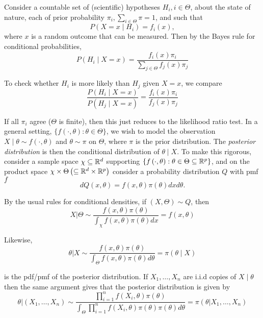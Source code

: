 \documentclass[a4paper]{article}
\begin{document}
\begin{eg}
	Consider a countable set of (scientific) hypotheses $H_i, i \in \Theta$, about the state of nature, each of prior probability $\pi_i, \sum_{i \in \Theta} \pi = 1$, and such that
	\[
		P\left( X=x \mid H_i \right) = f_i(x)
	,\]
	where $x$ is a random outcome that can be measured. Then by the Bayes rule for conditional probabilities,
	\[
		P\left( H_i  \mid  X = x \right) = \frac{f_i(x) \pi_i}{\sum_{j\in \Theta} f_j(x) \pi_j}
	\]

	To check whether $H_i$ is more likely than $H_j$ given  $X=x$, we compare
	 \[
		 \frac{P\left( H_i  \mid X=x \right)}{P\left( H_j  \mid X=x \right)} = \frac{f_i(x)\pi_i}{f_j(x)\pi_j}
	\]

	If all $\pi_i$ agree ($\Theta$ is finite), then this just reduces to the likelihood ratio test. In a general setting, $\{f\left( \cdot , \theta \right) : \theta \in \Theta \}$, we wish to model the observation $X \mid \theta \sim f(\cdot , \theta)$ and $\theta \sim \pi$ on $\Theta$, where $\pi$ is the prior distribution. The \textit{posterior distribution} is then the conditional distribution of $\theta  \mid X$. To make this rigorous, consider a sample space $\chi \subseteq \mathbb{R}^{d}$ supporting $\{f\left( \cdot , \theta \right) : \theta \in \Theta \subseteq \mathbb{R}^{p}\}$, and on the product space $\chi \times \Theta \left( \subseteq \mathbb{R}^{d} \times \mathbb{R}^{p} \right) $ consider a probability distribution $Q$ with pmf $f$
	 \[
		 dQ(x,\theta) = f(x,\theta)\pi(\theta)dxd\theta
	 .\]

	 By the usual rules for conditional densities, if $(X,\Theta) \sim Q$, then
	 \[
		 X | \Theta \sim \frac{f(x,\theta)\pi(\theta)}{\int_{\chi}f(x,\theta)\pi(\theta)dx} = f(x,\theta)
	 \]

	 Likewise,
	 \[
		 \theta  | X \sim \frac{f(x,\theta)\pi(\theta)}{\int_{\Theta} f(x,\theta) \pi(\theta) d\theta} = \pi(\theta \mid X)
	 \]

	 is the pdf/pmf of the posterior distribution. If $X_1, \ldots, X_n$ are i.i.d copies of $X \mid \theta$ then the same argument gives that the posterior distribution is given by  
	 \[
		 \theta|(X_1, \ldots, X_n) \sim \frac{\prod_{i=1}^{n}f(X_i, \theta) \pi(\theta)}{\int_{\Theta} \prod_{i=1}^{n} f(X_i, \theta) \pi(\theta) \pi(\theta) d\theta} = \pi(\theta|X_1, \ldots, X_n)
	 \] 
	 
\end{eg}
\end{document}
